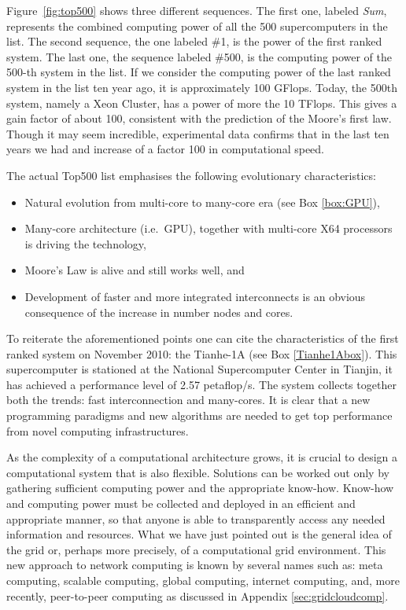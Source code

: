 Figure~\ref{fig:top500} shows three different sequences.  The first one, 
labeled {\em Sum}, represents the combined computing power of all the 
500 supercomputers in the list. The second sequence, the one labeled \#1, 
is the power of the first ranked system. The last one, the sequence labeled 
\#500, is the computing power of the 500-th system in the list. 
If we consider the computing power of the last ranked system
in the list ten year ago, it is approximately 100 GFlops. 
Today, the 500th system, namely a Xeon Cluster, has a power of more 
the 10 TFlops. This gives a gain factor of about 100, consistent with 
the prediction of the Moore's first law. Though it may seem incredible, 
experimental data confirms that in the last ten years we had and increase 
of a factor 100 in computational speed.   

The actual Top500 list emphasises the following evolutionary characteristics: 
\begin{itemize}
\item Natural evolution from multi-core to many-core era (see Box \ref{box:GPU}),
\item Many-core architecture (i.e.\ GPU), together with multi-core X64 processors
is driving the technology,
\item Moore's Law is alive and still works well, and
\item Development of faster and more integrated interconnects is an obvious 
consequence of the increase in number nodes and cores.
\end{itemize}


To reiterate the aforementioned points one can cite the characteristics 
of the first ranked system on November 2010: the Tianhe-1A (see Box 
\ref{Tianhe1Abox}). This supercomputer is stationed at the National 
Supercomputer Center in Tianjin, it has achieved a performance level of 
2.57 petaflop/s. The system collects together both the trends: fast 
interconnection and many-cores. It is clear that a new programming 
paradigms and new algorithms are needed to get top performance from 
novel computing infrastructures.

As the complexity of a computational architecture grows, it is crucial
to design a computational system that is also flexible. Solutions can
be worked out only by gathering sufficient computing power and
the appropriate know-how.  Know-how and computing power must be 
collected and deployed in an efficient and appropriate manner, 
so that anyone is able to transparently access any needed information and resources. 
What we have just pointed out is the general idea of the grid or,
perhaps more precisely, of a computational grid environment. This new
approach to network computing is known by several names such as:
meta computing, scalable computing, global computing, internet computing,
and, more recently, peer-to-peer computing as discussed in Appendix
\ref{sec:gridcloudcomp}.

